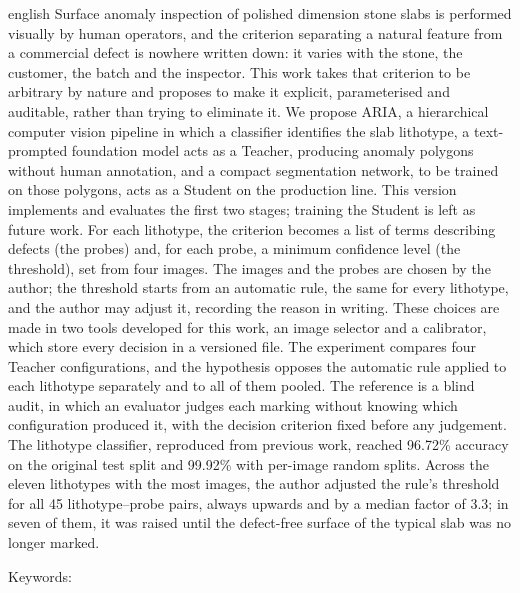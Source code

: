 \begin{resumo}[Abstract]
  \vspace{-15pt}

  \begin{otherlanguage*}{english}
  Surface anomaly inspection of polished dimension stone slabs is performed visually by human operators, and the criterion separating a natural feature from a commercial defect is nowhere written down: it varies with the stone, the customer, the batch and the inspector. This work takes that criterion to be arbitrary by nature and proposes to make it explicit, parameterised and auditable, rather than trying to eliminate it. We propose ARIA, a hierarchical computer vision pipeline in which a classifier identifies the slab lithotype, a text-prompted foundation model acts as a Teacher, producing anomaly polygons without human annotation, and a compact segmentation network, to be trained on those polygons, acts as a Student on the production line. This version implements and evaluates the first two stages; training the Student is left as future work. For each lithotype, the criterion becomes a list of terms describing defects (the probes) and, for each probe, a minimum confidence level (the threshold), set from four images. The images and the probes are chosen by the author; the threshold starts from an automatic rule, the same for every lithotype, and the author may adjust it, recording the reason in writing. These choices are made in two tools developed for this work, an image selector and a calibrator, which store every decision in a versioned file. The experiment compares four Teacher configurations, and the hypothesis opposes the automatic rule applied to each lithotype separately and to all of them pooled. The reference is a blind audit, in which an evaluator judges each marking without knowing which configuration produced it, with the decision criterion fixed before any judgement. The lithotype classifier, reproduced from previous work, reached 96.72\% accuracy on the original test split and 99.92\% with per-image random splits. Across the eleven lithotypes with the most images, the author adjusted the rule's threshold for all 45 lithotype--probe pairs, always upwards and by a median factor of 3.3; in seven of them, it was raised until the defect-free surface of the typical slab was no longer marked.

  Keywords: \inlinekeywords
\end{otherlanguage*}
\end{resumo}
